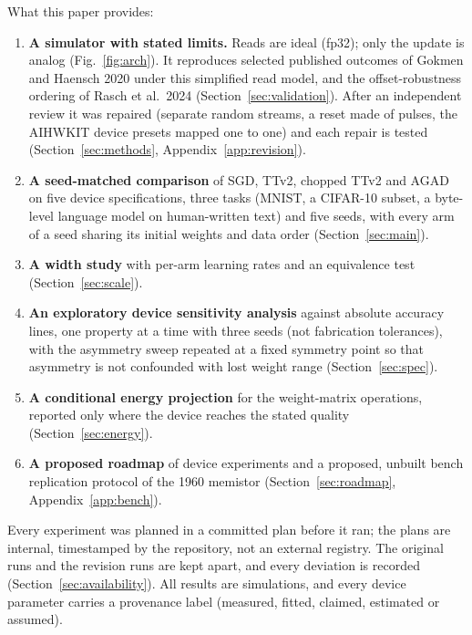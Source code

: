 What this paper provides:
\begin{enumerate}
\item \textbf{A simulator with stated limits.} Reads are ideal (fp32); only the update is analog (Fig.~\ref{fig:arch}). It reproduces selected
      published outcomes of Gokmen and Haensch 2020 under this simplified read model, and the offset-robustness ordering of
      Rasch et al.\ 2024 (Section~\ref{sec:validation}). After an independent review it was repaired (separate random streams, a
      reset made of pulses, the AIHWKIT device presets mapped one to one) and each repair is tested (Section~\ref{sec:methods},
      Appendix~\ref{app:revision}).
\item \textbf{A seed-matched comparison} of SGD, TTv2, chopped TTv2 and AGAD on five device specifications, three tasks (MNIST, a
      CIFAR-10 subset, a byte-level language model on human-written text) and five seeds, with every arm of a seed sharing its
      initial weights and data order (Section~\ref{sec:main}).
\item \textbf{A width study} with per-arm learning rates and an equivalence test (Section~\ref{sec:scale}).
\item \textbf{An exploratory device sensitivity analysis} against absolute accuracy lines, one property at a time with three
      seeds (not fabrication tolerances), with the asymmetry sweep repeated at a fixed symmetry point
      so that asymmetry is not confounded with lost weight range (Section~\ref{sec:spec}).
\item \textbf{A conditional energy projection} for the weight-matrix operations, reported only where the device reaches the
      stated quality (Section~\ref{sec:energy}).
\item \textbf{A proposed roadmap} of device experiments and a proposed, unbuilt bench replication protocol of the 1960
      memistor (Section~\ref{sec:roadmap}, Appendix~\ref{app:bench}).
\end{enumerate}

Every experiment was planned in a committed plan before it ran; the plans are internal, timestamped by the repository, not an
external registry. The original runs and the revision runs are kept apart, and every deviation is recorded
(Section~\ref{sec:availability}). All results are simulations, and every device parameter carries a provenance label
(measured, fitted, claimed, estimated or assumed).
